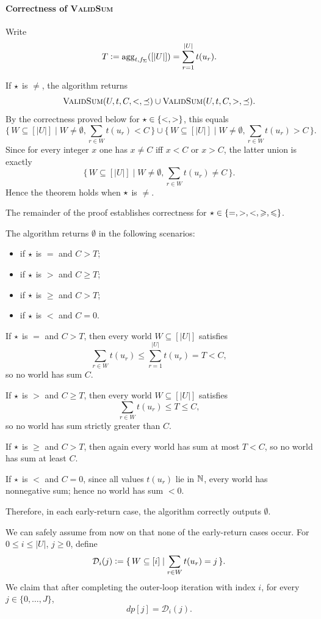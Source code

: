 
\begin{appendixproof}
\paragraph*{Correctness of \textsc{ValidSum}}
Write
\[
  T\mathrel{\mathop:}= \mathrm{agg}_{t,f_\Sigma}([|U|])=\sum_{r=1}^{|U|} t(u_r).
\]

If $\mathbin{\mathsf{\star}}$ is $\neq$, the algorithm returns
\[
\textsc{ValidSum}(U,t,C,<, \preceq)\cup\textsc{ValidSum}(U,t,C,>, \preceq).
\]
By the correctness proved below for ${\mathbin{\mathsf{\star}}}\in\{<,>\}$, this equals
\[
  \{\,W\subseteq [|U|]\mid W\neq\emptyset,\sum_{r\in W}t(u_r)<C\,\}
\cup
\{\,W\subseteq [|U|]\mid W\neq\emptyset,\sum_{r\in W}t(u_r)>C\,\}.
\]
Since for every integer $x$ one has $x\neq C$ iff $x<C$ or $x>C$, the latter union is exactly
\[
  \{\,W\subseteq [|U|]\mid W\neq\emptyset,\sum_{r\in W}t(u_r)\neq C\,\}.
\]
Hence the theorem holds when $\mathbin{\mathsf{\star}}$ is $\neq$.

\smallskip\noindent
The remainder of the proof establishes correctness for ${\mathbin{\mathsf{\star}}}\in\{=,>,<,\geqslant,\leqslant\}$.

The algorithm returns $\emptyset$ in the following scenarios:
\begin{itemize}
\item if $\mathbin{\mathsf{\star}}$ is $=$ and $C>T$;
\item if $\mathbin{\mathsf{\star}}$ is $>$ and $C\ge T$;
\item if $\mathbin{\mathsf{\star}}$ is $\ge$ and $C>T$;
\item if $\mathbin{\mathsf{\star}}$ is $<$ and $C=0$.
\end{itemize}
If $\mathbin{\mathsf{\star}}$ is $=$ and $C>T$, then every world $W\subseteq [|U|]$ satisfies
\[
  \sum_{r\in W} t(u_r)\le \sum_{r=1}^{|U|} t(u_r)=T<C,
\]
so no world has sum $C$.

If $\mathbin{\mathsf{\star}}$ is $>$ and $C\ge T$, then every world $W\subseteq [|U|]$ satisfies
\[
  \sum_{r\in W} t(u_r)\le T\le C,
\]
so no world has sum strictly greater than $C$.

If $\mathbin{\mathsf{\star}}$ is $\ge$ and $C>T$, then again every world has sum at most $T<C$, so no world has sum at least $C$.

If $\mathbin{\mathsf{\star}}$ is $<$ and $C=0$, since all values $t(u_r)$ lie in $\mathbb{N}$, every world has nonnegative sum; hence no world has sum $<0$.

Therefore, in each early-return case, the algorithm correctly outputs $\emptyset$.

We can safely assume from now on that none of the early-return cases occur.
For $0\le i\le |U|$, $j\ge 0$, define
\[
\mathcal D_i(j)\mathrel{\mathop:}=
\{\,W\subseteq [i]\mid \sum_{r\in W} t(u_r)=j\,\}.
\]
We claim that after completing the outer-loop iteration with index $i$,
for every $j\in\{0,\dots,J\}$,
\begin{equation}\label{eq:sumdp-invariant}
dp[j]=\mathcal D_i(j).
\end{equation}


\end{appendixproof}
